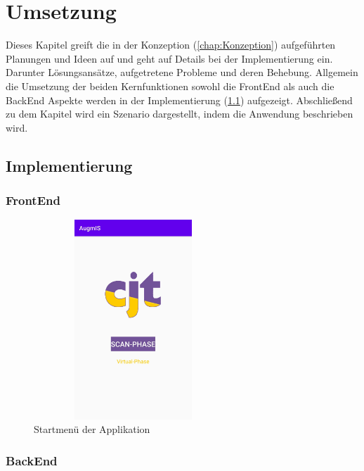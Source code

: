 

\chapter{Umsetzung}
\label{chap:Umsetzung}
Dieses Kapitel greift die in der Konzeption (\ref{chap:Konzeption}) aufgeführten Planungen und Ideen auf und geht auf Details bei der 
Implementierung ein. Darunter Lösungsansätze, aufgetretene Probleme und deren Behebung. Allgemein die Umsetzung der beiden Kernfunktionen 
sowohl die FrontEnd als auch die BackEnd Aspekte werden in der Implementierung (\ref{chap:implementierung}) aufgezeigt. Abschließend zu 
dem Kapitel wird ein Szenario dargestellt, indem die Anwendung beschrieben wird.

\section{Implementierung}
\label{chap:implementierung}
\subsection*{FrontEnd}
\begin{figure}[hbt!]
    \centering
    \includegraphics[width=7.5cm,height=7.5cm,keepaspectratio]{4Umsetzung/Bilder/startmenu.jpg}
    \caption{Startmenü der Applikation}
    \label{pic:startmenu}
\end{figure}
\subsection*{BackEnd}

